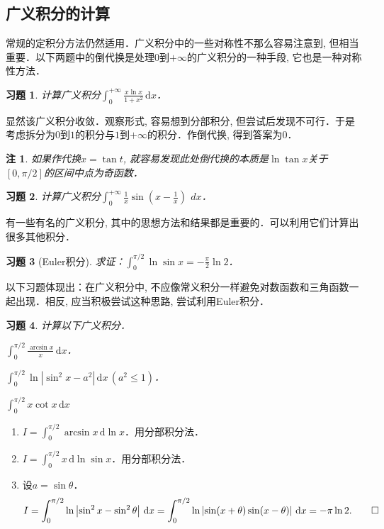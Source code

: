 \documentclass[11pt,a4paper]{ctexart}
\makeatletter
\theoremstyle{thmseries} %
\theoremstyle{exerseries}
\newtheorem{exer}{习题}[section]
\newtheorem*{rem}{注}
\renewenvironment{proof}[1][\proofname]{\par
  \pushQED{\qed}%
  \normalfont \topsep6\p@\@plus6\p@\relax
  \trivlist
  \item[\hskip\labelsep
        \itshape
    #1\@addpunct{}]\ignorespaces
}{%
  \popQED\endtrivlist\@endpefalse
}
\newenvironment{sol}{\begin{proof}[\bfseries\upshape 解\quad]}{\end{proof}}
\newcommand{\bra}[1]{\mathopen{}\left(#1\right)}
\renewcommand{\d}{\mathrm{d}}
\makeatother
\begin{document}
\subsection{广义积分的计算}
常规的定积分方法仍然适用．广义积分中的一些对称性不那么容易注意到, 但相当重要．以下两题中的倒代换是处理$0$到$+\infty$的广义积分的一种手段, 它也是一种对称性方法．
\begin{exer}
	计算广义积分$\int_{0}^{+\infty}\frac{x\ln x}{1+x^2}\,\d x$．
\end{exer}
\begin{sol}
	显然该广义积分收敛．观察形式, 容易想到分部积分, 但尝试后发现不可行．于是考虑拆分为$0$到$1$的积分与$1$到$+\infty$的积分．作倒代换, 得到答案为$0$．
\end{sol}
\begin{rem}
	如果作代换$x=\tan t$, 就容易发现此处倒代换的本质是$\ln\tan x$关于$[0,\pi/2]$的区间中点为奇函数．
\end{rem}

\begin{exer}
	计算广义积分$\int_{0}^{+\infty}\frac{1}{x}\sin\bra{x-\frac{1}{x}}\,\ dx$．
\end{exer}

有一些有名的广义积分, 其中的思想方法和结果都是重要的．可以利用它们计算出很多其他积分．
\begin{exer}[Euler积分]
	求证：$\int_{0}^{\pi/2}\ln\sin x=-\frac{\pi}{2}\ln 2$．
\end{exer}

以下习题体现出：在广义积分中, 不应像常义积分一样避免对数函数和三角函数一起出现．相反, 应当积极尝试这种思路, 尝试利用Euler积分．
\begin{exer}
	计算以下广义积分．
	\begin{enumerate}
	\end{enumerate}
\end{exer}
\begin{sol}
	\begin{enumerate}
		\item $I=\int_{0}^{\pi/2}\arcsin x\,\d\ln x$．用分部积分法．
		\item $I=\int_{0}^{\pi/2}x\,\d\ln\sin x$．用分部积分法．
		\item 设$a=\sin\theta$．
		\[I=\int_{0}^{\pi/2}\ln\left|\sin^2x-\sin^2\theta\right|\,\d x=\int_{0}^{\pi/2}\ln\left|\sin(x+\theta)\sin(x-\theta)\right|\,\d x=-\pi\ln 2.\qedhere\]
	\end{enumerate}
\end{sol}
\end{document}
